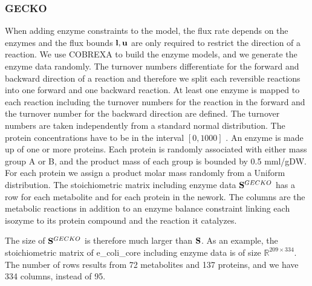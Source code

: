 \subsubsection{GECKO}
When adding enzyme constraints to the model, the flux rate depends on the enzymes and the flux bounds $\bold l, \bold u$ are only required to restrict the direction of a reaction.  
We use COBREXA to build the enzyme models, and we generate the enzyme data randomly.
The turnover numbers differentiate for the forward and backward direction of a reaction and therefore we split each reversible reactions into one forward and one backward reaction.
At least one enzyme is mapped to each reaction including the turnover numbers for the reaction in the forward and the turnover number for the backward direction are defined. 
The turnover numbers are taken independently from a standard normal distribution. %
The protein concentrations have to be in the interval $[0, 1000]$ %
. An enzyme is made up of one or more proteins.
Each protein is randomly associated with either mass group A or B, and the product mass of each group is bounded by 0.5 mml/gDW. For each protein we assign a product molar mass randomly from a Uniform distribution. 
The stoichiometric matrix including enzyme data $\bold S^{GECKO}$ has a row for each metabolite and for each protein in the nework. The columns are the metabolic reactions in addition to an enzyme balance constraint linking each isozyme to its protein compound and the reaction it catalyzes.

The size of $\bold S^{GECKO}$ is therefore much larger than $\bold S$.
As an example, the stoichiometric matrix of \textsf{e\_coli\_core} including enzyme data is of size $\mathbb{R}^{209 \times 334}$. The number of rows results from 72 metabolites and 137 proteins, and we have 334 columns, instead of 95. 

